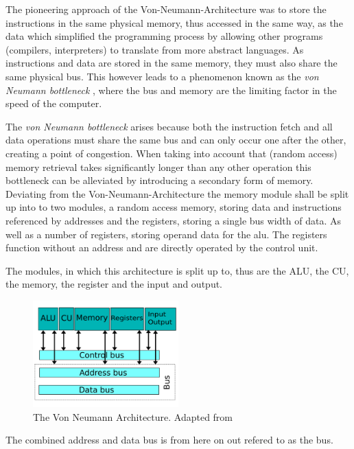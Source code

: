 The pioneering approach of the Von-Neumann-Architecture was to store the instructions in the same physical memory, thus accessed in the same way, as the data which simplified the programming process by allowing other programs (compilers, interpreters) to translate from more abstract languages. As instructions and data are stored in the same memory, they must also share the same physical bus. This however leads  to a phenomenon known as the \textit{von Neumann bottleneck} \cite{cit.needed}, where the bus and memory are the limiting factor in the speed of the computer. 

The \textit{von Neumann bottleneck} arises because both the instruction fetch and all data operations must share the same bus and can only occur one after the other, creating a point of congestion. When taking into account that (random access) memory retrieval takes significantly longer than any other operation this bottleneck can be alleviated by introducing a secondary form of memory. Deviating from the Von-Neumann-Architecture the memory module shall be split up into to two modules, a random access memory, storing data and instructions referenced by addresses and the registers, storing a single bus width of data. As well as a number of registers, storing operand data for the alu. The registers function without an address and are directly operated by the control unit.

The modules, in which this architecture is split up to, thus are the ALU, the CU, the memory, the register and the input and output. 

\begin{figure}[H]
  \begin{center}
    \includegraphics[width=0.5\textwidth]{figures/VNA-Adapted}
  \end{center}
  \caption{The Von Neumann Architecture. Adapted from \cite{fig-vna}}\label{fig:vna-adapted}
\end{figure}

The combined address and data bus is from here on out refered to as the bus.

